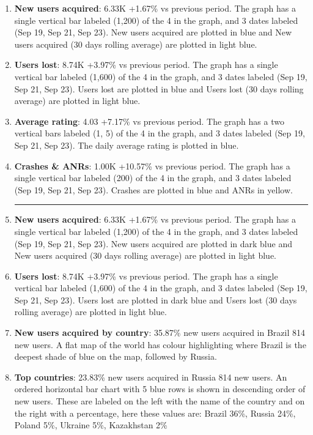 \begin{enumerate}
    \item \textbf{New users acquired}: 6.33K +1.67\% vs previous period. The graph has a single vertical bar labeled (1,200) of the 4 in the graph, and 3 dates labeled (Sep 19, Sep 21, Sep 23). New users acquired are plotted in blue and New users acquired (30 days rolling average) are plotted in light blue.
    \item \textbf{Users lost}: 8.74K +3.97\% vs previous period. The graph has a single vertical bar labeled (1,600) of the 4 in the graph, and 3 dates labeled (Sep 19, Sep 21, Sep 23). Users lost are plotted in blue and Users lost (30 days rolling average) are plotted in light blue.
    \item \textbf{Average rating}: 4.03 +7.17\% vs previous period. The graph has a two vertical bars labeled (1, 5) of the 4 in the graph, and 3 dates labeled (Sep 19, Sep 21, Sep 23). The daily average rating is plotted in blue.
    \item \textbf{Crashes \& ANRs}: 1.00K +10.57\% vs previous period. The graph has a single vertical bar labeled (200) of the 4 in the graph, and 3 dates labeled (Sep 19, Sep 21, Sep 23). Crashes are plotted in blue and ANRs in yellow.

    \vspace{0.1cm}
    \hrule
    \vspace{0.2cm}
      
    \item \textbf{New users acquired}: 6.33K +1.67\% vs previous period. The graph has a single vertical bar labeled (1,200) of the 4 in the graph, and 3 dates labeled (Sep 19, Sep 21, Sep 23). New users acquired are plotted in dark blue and New users acquired (30 days rolling average) are plotted in light blue.
    \item \textbf{Users lost}: 8.74K +3.97\% vs previous period. The graph has a single vertical bar labeled (1,600) of the 4 in the graph, and 3 dates labeled (Sep 19, Sep 21, Sep 23). Users lost are plotted in dark blue and Users lost (30 days rolling average) are plotted in light blue.
    \item \textbf{New users acquired by country}: 35.87\% new users acquired in Brazil 814 new users. A flat map of the world has colour highlighting where Brazil is the deepest shade of blue on the map, followed by Russia.
    \item \textbf{Top countries}: 23.83\% new users acquired in Russia 814 new users. An ordered horizontal bar chart with 5 blue rows is shown in descending order of new users. These are labeled on the left with the name of the country and on the right with a percentage, here these values are: Brazil 36\%, Russia 24\%, Poland 5\%, Ukraine 5\%, Kazakhstan 2\%
    

\end{enumerate}
